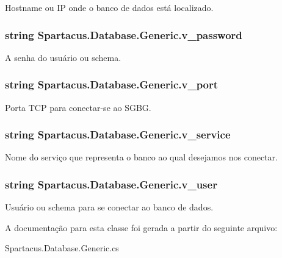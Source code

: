 Hostname ou I\+P onde o banco de dados está localizado. 

\hypertarget{classSpartacus_1_1Database_1_1Generic_a7a40ef878e5d8371034ced66a7b7b2bb}{
\subsubsection[{v\+\_\+password}]{\setlength{\rightskip}{0pt plus 5cm}string Spartacus.\+Database.\+Generic.\+v\+\_\+password}}\label{classSpartacus_1_1Database_1_1Generic_a7a40ef878e5d8371034ced66a7b7b2bb}


A senha do usuário ou schema. 

\hypertarget{classSpartacus_1_1Database_1_1Generic_a5df6e2c77be89b3e34903ca4fc0068d0}{
\subsubsection[{v\+\_\+port}]{\setlength{\rightskip}{0pt plus 5cm}string Spartacus.\+Database.\+Generic.\+v\+\_\+port}}\label{classSpartacus_1_1Database_1_1Generic_a5df6e2c77be89b3e34903ca4fc0068d0}


Porta T\+C\+P para conectar-\/se ao S\+G\+B\+G. 

\hypertarget{classSpartacus_1_1Database_1_1Generic_a3b7fd3196d76de6475c4a18edbfeea8f}{
\subsubsection[{v\+\_\+service}]{\setlength{\rightskip}{0pt plus 5cm}string Spartacus.\+Database.\+Generic.\+v\+\_\+service}}\label{classSpartacus_1_1Database_1_1Generic_a3b7fd3196d76de6475c4a18edbfeea8f}


Nome do serviço que representa o banco ao qual desejamos nos conectar. 

\hypertarget{classSpartacus_1_1Database_1_1Generic_a945755698e1b479f3e581ea918338ef5}{
\subsubsection[{v\+\_\+user}]{\setlength{\rightskip}{0pt plus 5cm}string Spartacus.\+Database.\+Generic.\+v\+\_\+user}}\label{classSpartacus_1_1Database_1_1Generic_a945755698e1b479f3e581ea918338ef5}


Usuário ou schema para se conectar ao banco de dados. 



A documentação para esta classe foi gerada a partir do seguinte arquivo\+:\begin{DoxyCompactItemize}
\item 
Spartacus.\+Database.\+Generic.\+cs\end{DoxyCompactItemize}
